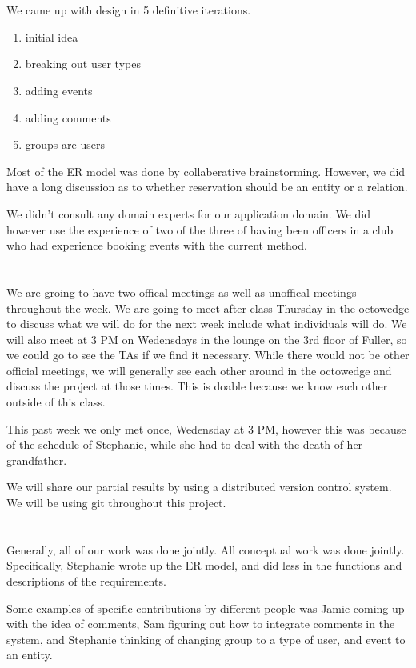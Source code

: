 \documentclass{article}
\begin{document}
\section{}
We came up with design in 5 definitive iterations. 
\begin{enumerate}
\item initial idea
\item breaking out user types
\item adding events
\item adding comments
\item groups are users
\end{enumerate}

Most of the ER model was done by collaberative brainstorming. However, we did
have a long discussion as to whether reservation should be an entity or a
relation.  

We didn't consult any domain experts for our application domain. We did however
use the experience of two of the three of having been officers in a club who had
experience booking events with the current method. 

\section{}
We are groing to have two offical meetings as well as unoffical meetings
throughout the week. We are going to meet after class Thursday in the octowedge
to discuss what we will do for the next week include what individuals will do.
We will also meet at 3 PM on Wedensdays in the lounge on the 3rd floor of
Fuller, so we could go to see the TAs if we find it necessary. While there would
not be other official meetings, we will generally see each other around in the
octowedge and discuss the project at those times. This is doable because we know
each other outside of this class. 

This past week we only met once, Wedensday at 3 PM, however this was because of
the schedule of Stephanie, while she had to deal with the death of her
grandfather. 

We will share our partial results by using a distributed version control system.
We will be using git throughout this project. 

\section{}
Generally, all of our work was done jointly. All conceptual work was done
jointly. Specifically, Stephanie wrote up the ER model, and did less in the
functions and descriptions of the requirements. 

Some examples of specific contributions by different people was Jamie coming up
with the idea of comments, Sam figuring out how to integrate comments
in the system, and Stephanie thinking of changing group to a type of user, and
event to an entity. 


\end{document}
